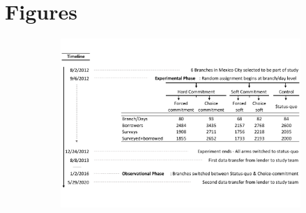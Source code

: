 \documentclass[oneside,11pt]{article}
\begin{document}








\section{Figures}



\begin{figure}[H]
     \caption{Experiment description}
    \label{exp_description}
\begin{center}
\begin{subfigure}{\textwidth}
        \includegraphics[width=\textwidth]{Figuras/consort.pdf}
    \end{subfigure}
  \end{center}
    \scriptsize 
\end{figure}
\end{document}
